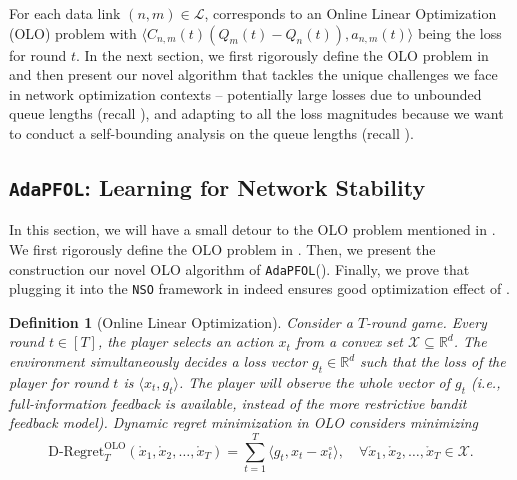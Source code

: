 \documentclass[11pt,fullpage,letterpaper]{article} %
\newtheorem{definition}[theorem]{Definition}
\renewcommand{\bm}[1]{#1}%
\newcommand{\mL}{{\mathcal L}}
\newcommand{\SSAlg}{\texttt{NSO}\xspace}
\newcommand{\OLOAlg}{\texttt{AdaPFOL}\xspace}
\begin{document}
For each data link $(n,m)\in \mL$,  corresponds to an {Online Linear Optimization} (OLO) problem with $ \langle C_{n,m}(t) (\bm Q_m(t)-\bm Q_n(t)), \bm a_{n,m}(t)\rangle$ being the loss for round $t$.
In the next section, we first rigorously define the OLO problem in  and then present our novel algorithm that tackles the unique challenges we face in network optimization contexts -- potentially large losses due to unbounded queue lengths (recall ), and adapting to all the loss magnitudes because we want to conduct a self-bounding analysis on the queue lengths (recall ).

\subsection{\OLOAlg: Learning for Network Stability}\label{sec:multi-hop stability OLO}
In this section, we will have a small detour to the OLO problem mentioned in . 
We first rigorously define the OLO problem \citep{zinkevich2003online,mcmahan2010adaptive,duchi2011adaptive} in . Then, we present the construction our novel OLO algorithm of \OLOAlg ().
Finally, we prove that plugging it into the \SSAlg framework in  indeed ensures good optimization effect of .
\begin{definition}[Online Linear Optimization]\label{def:OLO}
Consider a $T$-round game. Every round $t\in [T]$, the player selects an action $\bm x_t$ from a convex set $\mathcal X\subseteq \mathbb R^d$. The environment simultaneously decides a loss vector $\bm g_t\in \mathbb R^d$ such that the loss of the player for round $t$ is $\langle \bm x_t,\bm g_t\rangle$. The player will observe the whole vector of $\bm g_t$ (\textit{i.e.}, full-information feedback is available, instead of the more restrictive bandit feedback model). Dynamic regret minimization in OLO considers minimizing
\begin{equation*}
\text{D-Regret}_T^{\text{OLO}}(\mathring{\bm x}_1,\mathring{\bm x}_2,\ldots,\mathring{\bm x}_T)=\sum_{t=1}^T \langle \bm g_t,\bm x_t-\bm x_t^\circ\rangle,\quad \forall \mathring{\bm x}_1,\mathring{\bm x}_2,\ldots,\mathring{\bm x}_T\in \mathcal X.
\end{equation*}
\end{definition}
\end{document}
